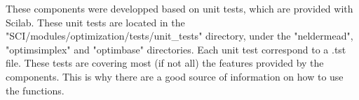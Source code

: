 These components were developped based on unit tests, which are 
provided with Scilab.
These unit tests are located in the "SCI/modules/optimization/tests/unit\_tests"
directory, under the "neldermead", "optimsimplex" and "optimbase" directories.
Each unit test correspond to a .tst file. These tests are covering most 
(if not all) the features provided by the components. This is why there are 
a good source of information on how to use the functions.





